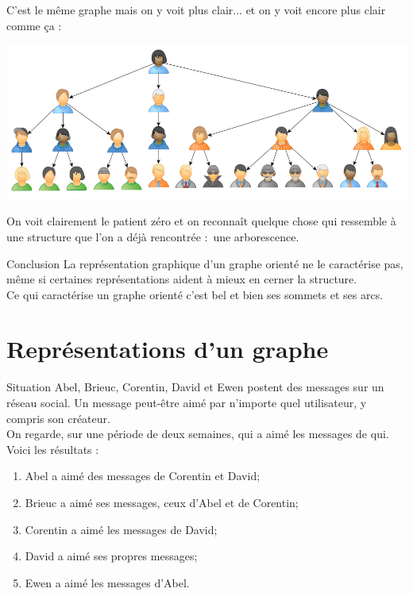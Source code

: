 \documentclass[10pt]{beamer}
\begin{document}
\begin{frame}{}
C'est le même graphe mais on y voit plus clair... et on y voit encore plus clair comme ça :
\end{frame}
\begin{frame}{}
\begin{center}
\includegraphics[width=\linewidth]{img/graphe2_tree.png}
\end{center}
On voit clairement le \og patient zéro\fg{} et on reconnaît quelque chose qui ressemble à une structure que l'on a déjà rencontrée :\pause \ une arborescence.
\end{frame}
\begin{frame}{Conclusion}
La représentation graphique d'un graphe orienté ne le caractérise pas, même si certaines représentations aident à mieux en cerner la structure.\\

Ce qui caractérise un graphe orienté c'est bel et bien ses \alert{sommets} et ses \alert{arcs}.
\end{frame}
\section{Représentations d'un graphe}
\begin{frame}{Situation}
Abel, Brieuc, Corentin, David et Ewen postent des messages sur un réseau social. Un message peut-être \og aimé\fg{} par n'importe quel utilisateur, y compris son créateur.\\ \pause
On regarde, sur une période de deux semaines, qui a aimé les messages de qui. Voici les résultats : \pause

\begin{enumerate}[--]
	\item 	Abel a aimé des messages de Corentin  et David;\pause
	\item 	Brieuc a aimé ses messages, ceux d'Abel et de Corentin;\pause
	\item 	Corentin a aimé les messages de David;\pause
	\item 	David a aimé ses propres messages;\pause
	\item 	Ewen a aimé les messages d'Abel.
\end{enumerate}
\end{frame}
\end{document}
